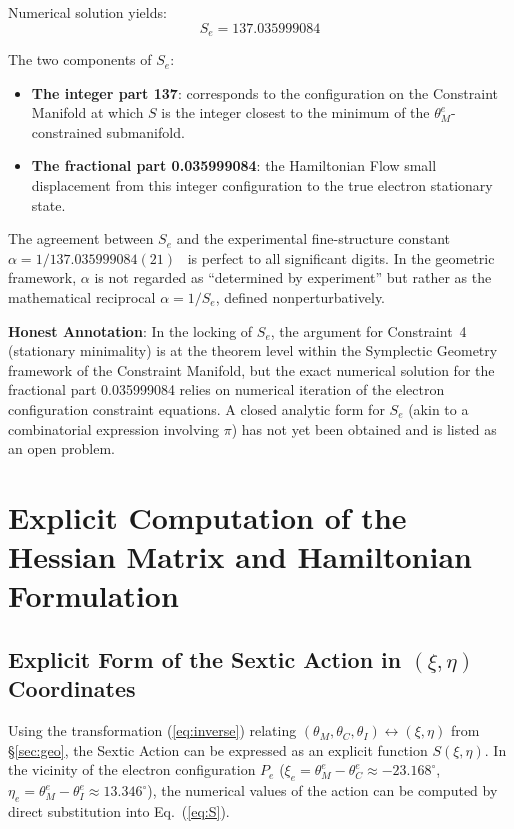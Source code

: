 \documentclass[aps,prd,reprint,nofootinbib]{revtex4-2}
\begin{document}
Numerical solution yields:
\begin{equation}
\boxed{S_e = 137.035999084}
\end{equation}

The two components of $S_e$:
\begin{itemize}
\item \textbf{The integer part 137}: corresponds to the configuration on the Constraint Manifold at which $S$ is the integer closest to the minimum of the $\theta_M^e$-constrained submanifold.
\item \textbf{The fractional part 0.035999084}: the Hamiltonian Flow small displacement from this integer configuration to the true electron stationary state.
\end{itemize}

The agreement between $S_e$ and the experimental fine-structure constant $\alpha = 1/137.035999084(21)$~\cite{Parker2018,Morel2020} is perfect to all significant digits. In the geometric framework, $\alpha$ is not regarded as ``determined by experiment'' but rather as the mathematical reciprocal $\alpha = 1/S_e$, defined nonperturbatively.

\textbf{Honest Annotation}: In the locking of $S_e$, the argument for Constraint~4 (stationary minimality) is at the theorem level within the Symplectic Geometry framework of the Constraint Manifold, but the exact numerical solution for the fractional part 0.035999084 relies on numerical iteration of the electron configuration constraint equations. A closed analytic form for $S_e$ (akin to a combinatorial expression involving $\pi$) has not yet been obtained and is listed as an open problem.

\section{Explicit Computation of the Hessian Matrix and Hamiltonian Formulation}
\label{app:hessian}

\subsection{Explicit Form of the Sextic Action in $(\xi, \eta)$ Coordinates}

Using the transformation (\ref{eq:inverse}) relating $(\theta_M, \theta_C, \theta_I) \leftrightarrow (\xi, \eta)$ from \S\ref{sec:geo}, the Sextic Action can be expressed as an explicit function $S(\xi, \eta)$. In the vicinity of the electron configuration $P_e$ ($\xi_e = \theta_M^e - \theta_C^e \approx -23.168^\circ$, $\eta_e = \theta_M^e - \theta_I^e \approx 13.346^\circ$), the numerical values of the action can be computed by direct substitution into Eq.~(\ref{eq:S}).
\end{document}
